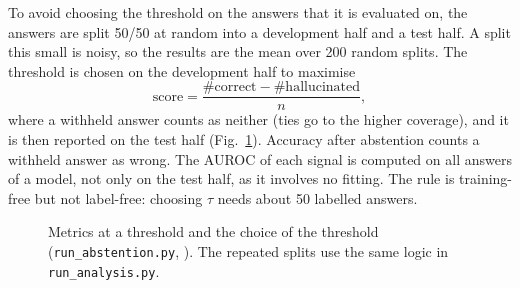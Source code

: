 To avoid choosing the threshold on the answers that it is evaluated on, the answers are split
50/50 at random into a development half and a test half. A split this small is noisy, so the results
are the mean over 200 random splits. The threshold is chosen on the development half to maximise
\begin{equation}
\text{score} = \frac{\#\text{correct} - \#\text{hallucinated}}{n},
\end{equation}
where a withheld answer counts as neither (ties go to the higher coverage), and it is then reported
on the test half (Fig.~\ref{fig:lst-threshold}). Accuracy after abstention counts a withheld answer
as wrong. The AUROC of each signal is computed on all answers of a model, not only on the test half,
as it involves no fitting. The rule is training-free but not label-free: choosing $\tau$ needs about 50
labelled answers.

\begin{figure}[htbp]

\caption{Metrics at a threshold and the choice of the threshold (\texttt{run\_abstention.py},
). The repeated splits use the same logic in \texttt{run\_analysis.py}.}\label{fig:lst-threshold}
\end{figure}

